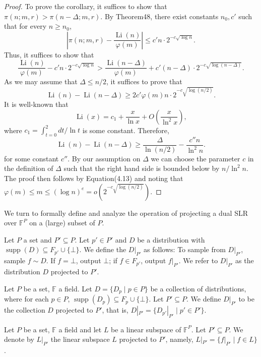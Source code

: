 \begin{proof}
To prove the corollary, it suffices to show that $\pi(n;m,r)>\pi(n-\Delta;m,r)$. By Theorem48, there exist constants $n_0,c'$ such that for every $n\geq n_0$,
\[\left|\pi(n;m,r)-\frac{\operatorname{Li}(n)}{\varphi(m)}\right|\leq c'n\cdot2^{-c\sqrt{\log n}}.\]
Thus, it suffices to show that
\[\frac{\operatorname{Li}(n)}{\varphi(m)}-c'n\cdot2^{-c\sqrt{\log n}}>\frac{\operatorname{Li}(n-\Delta)}{\varphi(m)}+c'(n-\Delta)\cdot2^{-c\sqrt{\log(n-\Delta)}}.\]
As we may assume that $\Delta\leq n/2$, it suffices to prove that
\begin{equation}\operatorname{Li}(n)-\operatorname{Li}(n-\Delta)\geq2c'\varphi(m)n\cdot2^{-c\sqrt{\log(n/2)}}.\tag{4.13}\end{equation}
It is well-known that
\[\operatorname{Li}(x)=c_1+\frac x{\ln x}+O\left(\frac x{\ln^2x}\right),\]
where $c_1=\int_{t=0}^2dt/\ln t$ is some constant. Therefore,
\[\operatorname{Li}(n)-\operatorname{Li}(n-\Delta)\geq\frac\Delta{\ln(n/2)}-\frac{c''n}{\ln^2n}.\]
for some constant $c''$. By our assumption on $\Delta$ we can choose the parameter $c$ in the definition of $\Delta$ such that the right hand side is bounded below by $n/\ln^2n$. The proof then follows by Equation(4.13) and noting that $\varphi(m)\leq m\leq(\log n)^e=o(2^{-c\sqrt{\log(n/2)}})$.
\end{proof}
We turn to formally define and analyze the operation of projecting a dual SLR over $\mathbb F^P$ on a (large) subset of $P$.
\begin{ntdefinition}
Let $P$ a set and $P'\subseteq P$. Let $p'\in P'$ and $D$ be a distribution with $\operatorname{supp}(D)\subseteq F_{p'}\cup\{\bot\}$. We define the $D|_{P'}$ as follows: To sample from $D|_{P'}$, sample $f\sim D$. If $f=\bot$, output $\bot$; if $f\in F_{p'}$, output $f|_{P'}$. We refer to $D|_{P'}$ as the distribution $D$ projected to $P'$.
\end{ntdefinition}
\begin{ntdefinition}
Let $P$ be a set, $\mathbb F$ a field. Let $D=\{D_p\mid p\in P\}$ be a collection of distributions, where for each $p\in P$, $\operatorname{supp}(D_p)\subseteq F_p\cup\{\bot\}$. Let $P'\subseteq P$. We define $D|_{P'}$ to be the collection $D$ projected to $P'$, that is, $D|_{P'}=\{D_{p'}|_{P'}\mid p'\in P'\}$.
\end{ntdefinition}
\begin{ntdefinition}
Let $P$ be a set, $\mathbb F$ a field and let $L$ be a linear subspace of $\mathbb F^P$. Let $P'\subseteq P$. We denote by $L|_{P'}$ the linear subspace $L$ projected to $P'$, namely, $L|_{P'}=\{f|_{P'}\mid f\in L\}$.
\end{ntdefinition}
